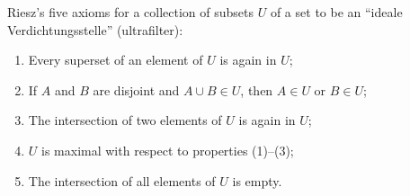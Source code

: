 Riesz's five axioms for a collection of subsets $U$ of a set to be an ``ideale Verdichtungsstelle'' (ultrafilter):
\begin{enumerate}
\item Every superset of an element of $U$ is again in $U$;
\item If $A$ and $B$ are disjoint and $A \cup B \in U$, then $A \in U$ or $B \in U$;
\item The intersection of two elements of $U$ is again in $U$;
\item $U$ is maximal with respect to properties (1)--(3);
\item The intersection of all elements of $U$ is empty.
\end{enumerate}
